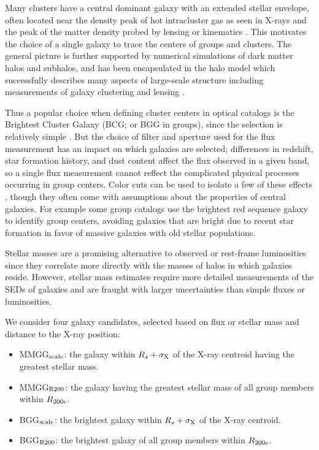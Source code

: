 Many clusters have a central dominant galaxy with an extended stellar
envelope, often located near the density peak of hot intracluster gas
as seen in X-rays and the peak of the matter density probed by lensing
or kinematics \citep[e.g.,][and references therein]{Lin2004b}. This
motivates the choice of a single galaxy to trace the centers of groups
and clusters. The general picture is further supported by numerical
simulations of dark matter halos and subhalos, and has been
encapsulated in the halo model which successfully describes many
aspects of large-scale structure including measurements of galaxy
clustering and lensing \citep[e.g.,][]{Cooray2002, Zehavi2005,
  Mandelbaum2006a, Leauthaud2012}.

Thus a popular choice when defining cluster centers in optical catalogs is
the Brightest Cluster Galaxy (BCG; or BGG in groups), since the
selection is relatively simple 
\citep[e.g.,][]{Koester2007a, Hao2010}. But the choice of filter and
aperture used for the flux measurement has an impact on which galaxies
are selected; differences in redshift, star formation history, and
dust content affect the flux observed in a given band, so a single
flux measurement cannot reflect the complicated physical processes
occurring in group centers. Color cuts can be used to isolate a few of
these effects \citep[e.g.,][]{Gladders2000}, though they often come
with assumptions about the properties of central galaxies. For example
some group catalogs use the brightest red sequence galaxy to identify
group centers, avoiding galaxies that are bright due to recent star
formation in favor of massive galaxies with old stellar
populations. 

Stellar masses are a promising alternative to observed or
rest-frame luminosities since they correlate more directly with the
masses of halos in which galaxies reside. However, stellar mass
estimates require more detailed measurements of the SEDs of galaxies
and are fraught with larger uncertainties than simple fluxes or luminosities.

We consider four galaxy candidates, selected based on
flux or stellar mass and distance to the X-ray position:

\begin{itemize}
\item MMGG$_{\rm scale}$: the galaxy within $R_{s}+\sigma_{\rm X}$ of
  the X-ray centroid having the greatest stellar mass.
\item MMGG$_{\rm R200}$: the galaxy having the greatest stellar mass
  of all group members within $R_{\rm 200c}$.
\item BGG$_{\rm scale}$: the brightest galaxy within $R_{s}+\sigma_{\rm X}$ of
  the X-ray centroid.
\item BGG$_{\rm R200}$: the brightest galaxy of all group members
  within $R_{\rm 200c}$.
\end{itemize}

